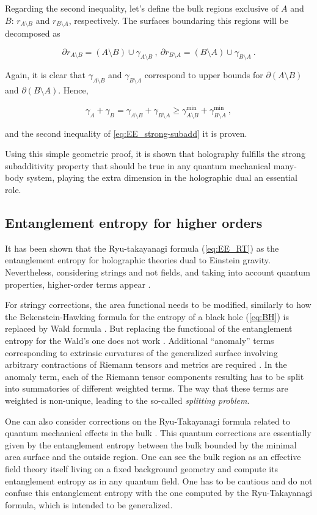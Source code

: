\documentclass[twocolumn]{revtex4}
\providecommand{\eq}[2]{
    \begin{equation}
        #2
    \label{eq:#1}
    \end{equation}
}
\begin{document}
Regarding the second inequality, let's define the bulk regions exclusive of $A$ and $B$: $r_{A \setminus B}$ and $r_{B \setminus A}$, respectively. The surfaces boundaring this regions will be decomposed as
\eq{SS_dr-2}{
    \partial r_{A \setminus B} = (A \setminus B) \cup \gamma_{A \setminus B} \ , \ \partial r_{B \setminus A } = (B \setminus A) \cup \gamma_{B \setminus A} \ .
}
Again, it is clear that $\gamma_{A \setminus B}$ and $\gamma_{B \setminus A}$ correspond to upper bounds for $\partial (A \setminus B)$ and $\partial (B \setminus A)$. Hence,
\eq{SS_gamma-2}{
    \gamma_A + \gamma_B = \gamma_{A \setminus B} + \gamma_{B \setminus A} \ge \gamma^{\text{min}}_{A \setminus B} + \gamma^{\text{min}}_{B \setminus A} \ ,
}
and the second inequality of \ref{eq:EE_strong-subadd} it is proven.

Using this simple geometric proof, it is shown that holography fulfills the strong subadditivity property that should be true in any quantum mechanical many-body system, playing the extra dimension in the holographic dual an essential role.


\subsection{Entanglement entropy for higher orders} \label{s:EE_HO}

It has been shown that the Ryu-takayanagi formula (\ref{eq:EE_RT}) as the entanglement entropy for holographic theories dual to Einstein gravity. Nevertheless, considering strings and not fields, and taking into account quantum properties, higher-order terms appear \cite{bueno_holographic_2021}.

For stringy corrections, the area functional needs to be modified, similarly to how the Bekenstein-Hawking formula for the entropy of a black hole (\ref{eq:BH}) is replaced by Wald formula \cite{iyer_properties_1994}. But replacing the functional of the entanglement entropy for the Wald's one does not work \cite{bueno_holographic_2021}. Additional ``anomaly'' terms corresponding to extrinsic curvatures of the generalized surface involving arbitrary contractions of Riemann tensors and metrics are required \cite{dong_holographic_2014}. In the anomaly term, each of the Riemann tensor components resulting has to be split into summatories of different weighted terms. The way that these terms are weighted is non-unique, leading to the so-called \textit{splitting problem}.

One can also consider corrections on the Ryu-Takayanagi formula related to quantum mechanical effects in the bulk \cite{faulkner_quantum_2013}. This quantum corrections are essentially given by the entanglement entropy between the bulk bounded by the minimal area surface and the outside region. One can see the bulk region as an effective field theory itself living on a fixed background geometry and compute its entanglement entropy as in any quantum field. One has to be cautious and do not confuse this entanglement entropy with the one computed by the Ryu-Takayanagi formula, which is intended to be generalized.
\end{document}
